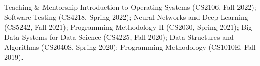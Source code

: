 \begin{rSection}{Teaching \& Mentorship}
\vspace{-0.4em}
\noindent Introduction to Operating Systems (CS2106, Fall 2022); Software Testing (CS4218, Spring 2022); Neural Networks and Deep Learning (CS5242, Fall 2021); Programming Methodology II (CS2030, Spring 2021); Big Data Systems for Data Science (CS4225, Fall 2020); Data Structures and Algorithms (CS2040S, Spring 2020); Programming Methodology (CS1010E, Fall 2019).

\smallskip
{}

\end{rSection}
